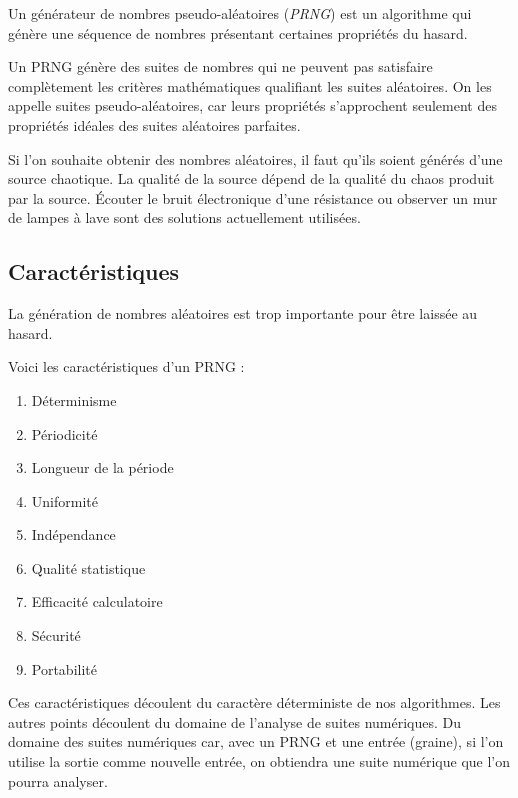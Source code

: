 \documentclass[9pt,a4paper,twoside,english]{class/backend}
\begin{document}
    Un générateur de nombres pseudo-aléatoires (\textit{PRNG}) est un algorithme qui génère une séquence de nombres présentant certaines propriétés du hasard. \cite{Wiki}
    
    Un PRNG génère des suites de nombres qui ne peuvent pas satisfaire complètement les critères mathématiques qualifiant les suites aléatoires. On les appelle suites pseudo-aléatoires, car leurs propriétés s'approchent seulement des propriétés idéales des suites aléatoires parfaites.
    
    Si l'on souhaite obtenir des nombres aléatoires, il faut qu'ils soient générés d'une source chaotique. La qualité de la source dépend de la qualité du chaos produit par la source. Écouter le bruit électronique d'une résistance ou observer un mur de lampes à lave \cite{lavarand} sont des solutions actuellement utilisées.

    
    \subsection{Caractéristiques}

    \begin{rhoenv}[frametitle={Clifford A. Pickover, \citetitle{CPCB}}]
    La génération de nombres aléatoires est trop importante pour être laissée au hasard.
    \end{rhoenv}
    
    Voici les caractéristiques d'un PRNG :
    \nolinenumbers
    \vspace{-1em}
    \begin{multicols}{2}
        \begin{enumerate}
            \item Déterminisme
            \item Périodicité
            \item Longueur de la période
            \item Uniformité
            \item Indépendance
            \item Qualité statistique
            \item Efficacité calculatoire
            \item Sécurité
            \item Portabilité
        \end{enumerate}
    \end{multicols}
    \linenumbers
    Ces caractéristiques découlent du caractère déterministe de nos algorithmes. Les autres points découlent du domaine de l’analyse de suites numériques.
    Du domaine des suites numériques car, avec un PRNG et une entrée (graine), si l'on utilise la sortie comme nouvelle entrée, on obtiendra une suite numérique que l'on pourra analyser. 
\end{document}
